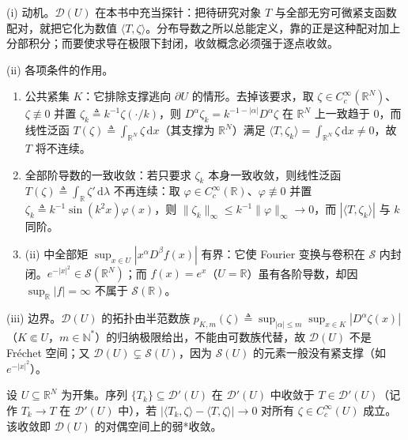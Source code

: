 \documentclass[../../main.tex]{subfiles}%
\begin{document}
\begin{remark}\label{remark:ch03-检验函数动机}
(i) 动机。$\mathcal{D}(U)$ 在本书中充当探针：把待研究对象 $T$ 与全部无穷可微紧支函数配对，就把它化为数值 $\langle T,\zeta\rangle$。分布导数之所以总能定义，靠的正是这种配对加上分部积分；而要使求导在极限下封闭，收敛概念必须强于逐点收敛。

(ii) 各项条件的作用。
\begin{enumerate}[(1)]
\item 公共紧集 $K$：它排除支撑逃向 $\partial U$ 的情形。去掉该要求，取 $\zeta\in C^\infty_c(\mathbb{R}^N)$、$\zeta\not\equiv0$ 并置 $\zeta_k\triangleq k^{-1}\zeta(\cdot/k)$，则 $D^\alpha\zeta_k=k^{-1-|\alpha|}D^\alpha\zeta$ 在 $\mathbb{R}^N$ 上一致趋于 $0$，而线性泛函 $T(\zeta)\triangleq\int_{\mathbb{R}^N}\zeta\,\mathrm{d}x$（其支撑为 $\mathbb{R}^N$）满足 $\langle T,\zeta_k\rangle=\int_{\mathbb{R}^N}\zeta\,\mathrm{d}x\neq0$，故 $T$ 将不连续。
\item 全部阶导数的一致收敛：若只要求 $\zeta_k$ 本身一致收敛，则线性泛函 $T(\zeta)\triangleq\int_{\mathbb{R}}\zeta'\,\mathrm{d}\lambda$ 不再连续：取 $\varphi\in C^\infty_c(\mathbb{R})$、$\varphi\not\equiv0$ 并置 $\zeta_k\triangleq k^{-1}\sin(k^2x)\varphi(x)$，则 $\|\zeta_k\|_\infty\leqslant k^{-1}\|\varphi\|_\infty\to0$，而 $|\langle T,\zeta_k\rangle|$ 与 $k$ 同阶。
\item (ii) 中全部矩 $\sup_{x\in U}|x^\alpha D^\beta f(x)|$ 有界：它使 Fourier 变换与卷积在 $\mathcal{S}$ 内封闭。$e^{-|x|^2}\in\mathcal{S}(\mathbb{R}^N)$；而 $f(x)=e^{x}$（$U=\mathbb{R}$）虽有各阶导数，却因 $\sup_{\mathbb{R}}|f|=\infty$ 不属于 $\mathcal{S}(\mathbb{R})$。
\end{enumerate}

(iii) 边界。$\mathcal{D}(U)$ 的拓扑由半范数族 $p_{K,m}(\zeta)\triangleq\sup_{|\alpha|\leqslant m}\sup_{x\in K}|D^\alpha\zeta(x)|$（$K\Subset U$，$m\in\mathbb{N}^*$）的归纳极限给出，不能由可数族代替，故 $\mathcal{D}(U)$ 不是 Fréchet 空间；又 $\mathcal{D}(U)\subsetneq\mathcal{S}(U)$，因为 $\mathcal{S}(U)$ 的元素一般没有紧支撑（如 $e^{-|x|^2}$）。
\end{remark}

\begin{definition}\label{definition:ch03-分布收敛}
设 $U\subseteq\mathbb{R}^N$ 为开集。序列 $\{T_k\}\subseteq\mathcal{D}'(U)$ 在 $\mathcal{D}'(U)$ 中收敛于 $T\in\mathcal{D}'(U)$（记作 $T_k\to T$ 在 $\mathcal{D}'(U)$ 中），若 $|\langle T_k,\zeta\rangle-\langle T,\zeta\rangle|\to0$ 对所有 $\zeta\in C^\infty_c(U)$ 成立。该收敛即 $\mathcal{D}(U)$ 的对偶空间上的弱*收敛。
\end{definition}
\end{document}
